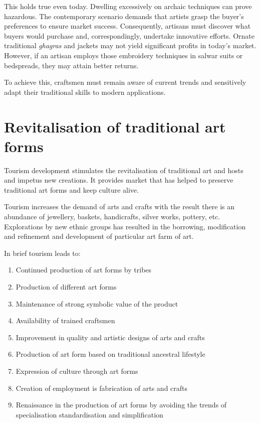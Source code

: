 This holds true even today. Dwelling excessively on archaic techniques can prove hazardous. The contemporary scenario demands that artists grasp the buyer's preferences to ensure market success. Consequently, artisans must discover what buyers would purchase and, correspondingly, undertake innovative efforts. Ornate traditional \emph{ghagras} and jackets may not yield significant profits in today's market. However, if an artisan employs those embroidery techniques in salwar suits or bedspreads, they may attain better returns.

To achieve this, craftsmen must remain aware of current trends and sensitively adapt their traditional skills to modern applications.


\section{Revitalisation of traditional art forms} %
\label{sec:rev}

Tourism development stimulates the revitalisation of traditional art and hosts and impetus new creations. It provides market that has helped to preserve traditional art forms and keep culture alive.

Tourism increases the demand of arts and crafts with the result there is an abundance of jewellery, baskets, handicrafts, silver works, pottery, etc. Explorations by new ethnic groups has resulted in the borrowing, modification and refinement and development of particular art farm of art.

In brief tourism leads to:

\begin{enumerate}[noitemsep]
  \item Continued production of art forms by tribes
  \item Production of different art forms
  \item Maintenance of strong symbolic value of the product
  \item Availability of trained craftsmen
  \item Improvement in quality and artistic designs of arts and crafts
  \item Production of art form based on traditional ancestral lifestyle
  \item Expression of culture through art forms
  \item Creation of employment is fabrication of arts and crafts
  \item Renaissance in the production of art forms by avoiding the trends of specialisation standardisation and simplification
\end{enumerate}


